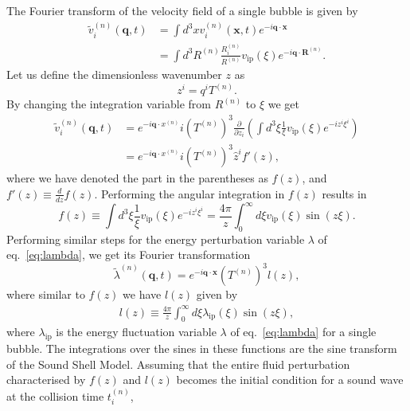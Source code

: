 The Fourier transform of the velocity field of a single bubble is given by
\cite[eq. 4.3]{hindmarsh_gw_pt_2019}
\begin{align}
\tilde{v}_i^{(n)} (\mathbf{q},t)
&= \int d^3 x v_i^{(n)} (\mathbf{x},t) e^{-i \mathbf{q} \cdot \mathbf{x}} \\
&= \int d^3 R^{(n)} \frac{R_i^{(n)}}{R^{(n)}} v_\text{ip}(\xi) e^{-i \mathbf{q} \cdot \mathbf{R}^{(n)}}.
\end{align}
Let us define the dimensionless wavenumber $z$ as
\begin{equation}
z^i = q^i T^{(n)}.
\end{equation}
By changing the integration variable from $R^{(n)}$ to $\xi$ we get
\cite[eq. 4.4, eq. 4.6]{hindmarsh_gw_pt_2019}
\begin{align}
\tilde{v}_i^{(n)} (\mathbf{q},t)
&= e^{-i \mathbf{q} \cdot x^{(n)}} i (T^{(n)})^3 \frac{\partial}{\partial z_i} \left(
\int d^3 \xi \frac{1}{\xi} v_\text{ip}(\xi) e^{-i z^i \xi^i} \right) \\
&= e^{-i \mathbf{q} \cdot x^{(n)}} i (T^{(n)})^3 \hat{z}^i f'(z),
\end{align}
where we have denoted the part in the parentheses as $f(z)$, and $f'(z) \equiv \frac{d}{dz}f(z)$.
Performing the angular integration in $f(z)$ results in
\cite[eq. 4.5]{hindmarsh_gw_pt_2019}
\begin{equation}
f(z) \equiv \int d^3\xi \frac{1}{\xi} v_\text{ip}(\xi) e^{-iz^i \xi^i}
= \frac{4\pi}{z} \int_0^\infty d\xi v_\text{ip}(\xi) \sin(z\xi).
\label{eq:ssm_f}
\end{equation}
Performing similar steps for the energy perturbation variable $\lambda$ of eq.~\eqref{eq:lambda},
we get its Fourier transformation
\begin{equation}
\tilde{\lambda}^{(n)}(\mathbf{q},t) = e^{-i \mathbf{q} \cdot \mathbf{x}} (T^{(n)})^3 l(z),
\end{equation}
where similar to $f(z)$ we have $l(z)$ given by
\cite[eq. 4.8]{hindmarsh_gw_pt_2019}
\begin{align}
l(z) \equiv \frac{4 \pi}{z} \int_0^\infty d\xi \lambda_\text{ip}(\xi) \sin(z\xi),
\label{eq:ssm_l}
\end{align}
where $\lambda_\text{ip}$ is the energy fluctuation variable $\lambda$ of eq.~\eqref{eq:lambda} for a single bubble.
The integrations over the sines in these functions are the sine transform of the Sound Shell Model.
Assuming that the entire fluid perturbation characterised by $f(z)$ and $l(z)$ becomes the initial condition for a sound wave at the collision time $t_i^{(n)}$,
